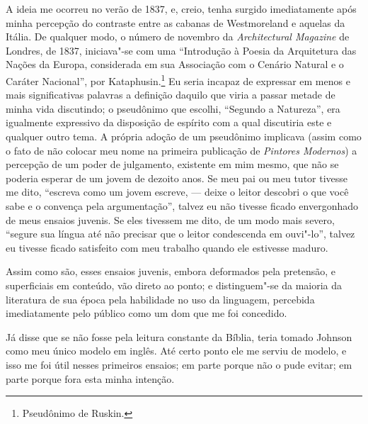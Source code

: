 A ideia me ocorreu no verão de 1837, e, creio, tenha surgido
imediatamente após minha percepção do contraste entre as cabanas de
Westmoreland e aquelas da Itália. De qualquer modo, o número de novembro
da \textit{Architectural Magazine} de Londres, de 1837, iniciava"-se com
uma ``Introdução à Poesia da Arquitetura das Nações da Europa,
considerada em sua Associação com o Cenário Natural e o Caráter
Nacional'', por Kataphusin.\footnote{Pseudônimo de Ruskin.}
Eu seria incapaz de expressar em menos e mais significativas palavras a
definição daquilo que viria a passar metade de minha vida discutindo; o
pseudônimo que escolhi, ``Segundo a Natureza'', era igualmente
expressivo da disposição de espírito com a qual discutiria este e
qualquer outro tema. A própria adoção de um pseudônimo implicava (assim
como o fato de não colocar meu nome na primeira publicação de
\textit{Pintores Modernos}) a percepção de um poder de julgamento,
existente em mim mesmo, que não se poderia esperar de um jovem de
dezoito anos. Se meu pai ou meu tutor tivesse me dito, ``escreva como um
jovem escreve, --- deixe o leitor descobri o que você sabe e o convença
pela argumentação'', talvez eu não tivesse ficado envergonhado de meus
ensaios juvenis. Se eles tivessem me dito, de um modo mais severo,
``segure sua língua até não precisar que o leitor condescenda em
ouvi"-lo'', talvez eu tivesse ficado satisfeito com meu trabalho quando
ele estivesse maduro.

Assim como são, esses ensaios juvenis, embora deformados pela pretensão,
e superficiais em conteúdo, vão direto ao ponto; e distinguem"-se da
maioria da literatura de sua época pela habilidade no uso da linguagem,
percebida imediatamente pelo público como um dom que me foi concedido.

Já disse que se não fosse pela leitura constante da Bíblia, teria
tomado Johnson como meu único modelo em inglês. Até certo ponto ele me
serviu de modelo, e isso me foi útil nesses primeiros ensaios; em parte
porque não o pude evitar; em parte porque fora esta minha intenção.

